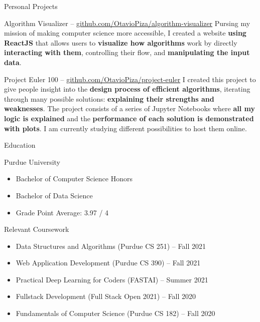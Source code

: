\documentclass{article}
\newlength{\tabin}
\newlength{\secsep}
\newcommand{\lineunder}{\vspace*{-8pt} \\ \hspace*{-6pt} \hrulefill \\ \vspace*{-15pt}}
\newenvironment{tabbedsection}[1]{
  \begin{list}{}{
      \setlength{\itemsep}{0pt}
      \setlength{\labelsep}{0pt}
      \setlength{\labelwidth}{0pt}
      \setlength{\leftmargin}{\tabin}
      \setlength{\rightmargin}{\tabin}
      \setlength{\listparindent}{0pt}
      \setlength{\parsep}{0pt}
      \setlength{\parskip}{0pt}
      \setlength{\partopsep}{0pt}
      \setlength{\topsep}{#1}
    }
  \item[]
}{\end{list}}
\newenvironment{resume_section}[1]{
  \filbreak
  \vspace{2\secsep}
  \textsc{\large#1}
  \lineunder
  \begin{tabbedsection}{\secsep}
}{\end{tabbedsection}}
\newenvironment{resume_subsection}[2][]{
  \textbf{#2} \hfill {\footnotesize #1} \hspace{2em}
  \begin{tabbedsection}{0.5\secsep}
}{\end{tabbedsection}}
\newenvironment{subitems}{
  \renewcommand{\labelitemi}{-}
  \begin{itemize}
      \setlength{\labelsep}{1em}
}{\end{itemize}}
\begin{document}
\begin{resume_section}{Personal Projects}

	\begin{resume_subsection}{Algorithm Visualizer -- \href{https://www.github.com/OtavioPiza/algorithm-visualizer}{github.com/OtavioPiza/algorithm-visualizer}}
		Pursing my mission of making computer science more accessible, I created a website \textbf{using ReactJS} that allows users to \textbf{visualize how algorithms} work by directly \textbf{interacting with them}, controlling their flow, and \textbf{manipulating the input data}. 
	\end{resume_subsection}
	
	\begin{resume_subsection}{Project Euler 100 -- \href{https://www.github.com/OtavioPiza/project-euler}{github.com/OtavioPiza/project-euler}}
		I created this project to give people insight into the \textbf{design process of efficient algorithms}, iterating through many possible solutions: \textbf{explaining their strengths and weaknesses}. The project consists of a series of Jupyter Notebooks where \textbf{all my logic is explained} and the \textbf{performance of each solution is demonstrated with plots}. I am currently studying different possibilities to host them online.  
	\end{resume_subsection}

\end{resume_section}

\begin{resume_section}{Education}
  
  \begin{resume_subsection}{Purdue University}
    
    \begin{subitems}
      \item Bachelor of Computer Science Honors
      \item Bachelor of Data Science
      \item Grade Point Average: 3.97 / 4
    \end{subitems}
  
  \end{resume_subsection}
  
  \begin{resume_subsection}[]{Relevant Coursework}
  	
	\begin{subitems}
		\item Data Structures and Algorithms (Purdue CS 251) -- Fall 2021
		\item Web Application Development (Purdue CS 390) -- Fall 2021
		\item Practical Deep Learning for Coders (FASTAI) -- Summer 2021
		\item Fullstack Development (Full Stack Open 2021) -- Fall 2020
		\item Fundamentals of Computer Science (Purdue CS 182) -- Fall 2020
	\end{subitems}  	
  	
  \end{resume_subsection}
  
\end{resume_section}
\end{document}
